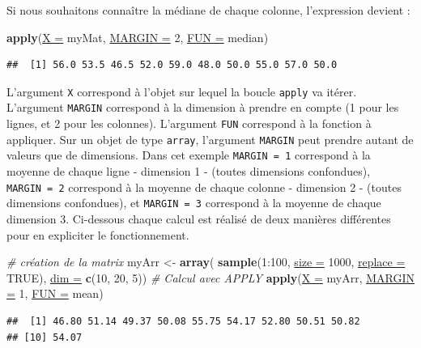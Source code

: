 \documentclass[twoside,symmetric]{book}
\newenvironment{Shaded}{}{}
\newcommand{\CommentTok}[1]{\textit{#1}}
\newcommand{\DataTypeTok}[1]{\underline{#1}}
\newcommand{\DecValTok}[1]{#1}
\newcommand{\KeywordTok}[1]{\textbf{#1}}
\newcommand{\NormalTok}[1]{#1}
\newcommand{\OperatorTok}[1]{#1}
\newcommand{\OtherTok}[1]{#1}
\newcommand{\StringTok}[1]{#1}
\begin{document}
Si nous souhaitons connaître la médiane de chaque colonne, l'expression devient :

\begin{Shaded}
\begin{Highlighting}[]
\KeywordTok{apply}\NormalTok{(}\DataTypeTok{X =}\NormalTok{ myMat, }\DataTypeTok{MARGIN =} \DecValTok{2}\NormalTok{, }\DataTypeTok{FUN =}\NormalTok{ median)}
\end{Highlighting}
\end{Shaded}

\begin{verbatim}
##  [1] 56.0 53.5 46.5 52.0 59.0 48.0 50.0 55.0 57.0 50.0
\end{verbatim}

L'argument \texttt{X} correspond à l'objet sur lequel la boucle \texttt{apply} va itérer. L'argument \texttt{MARGIN} correspond à la dimension à prendre en compte (1 pour les lignes, et 2 pour les colonnes). L'argument \texttt{FUN} correspond à la fonction à appliquer. Sur un objet de type \texttt{array}, l'argument \texttt{MARGIN} peut prendre autant de valeurs que de dimensions. Dans cet exemple \texttt{MARGIN\ =\ 1} correspond à la moyenne de chaque ligne - dimension 1 - (toutes dimensions confondues), \texttt{MARGIN\ =\ 2} correspond à la moyenne de chaque colonne - dimension 2 - (toutes dimensions confondues), et \texttt{MARGIN\ =\ 3} correspond à la moyenne de chaque dimension 3. Ci-dessous chaque calcul est réalisé de deux manières différentes pour en expliciter le fonctionnement.

\begin{Shaded}
\begin{Highlighting}[]
\CommentTok{# création de la matrix}
\NormalTok{myArr <-}\StringTok{ }\KeywordTok{array}\NormalTok{(}
  \KeywordTok{sample}\NormalTok{(}\DecValTok{1}\OperatorTok{:}\DecValTok{100}\NormalTok{, }\DataTypeTok{size =} \DecValTok{1000}\NormalTok{, }\DataTypeTok{replace =} \OtherTok{TRUE}\NormalTok{), }
  \DataTypeTok{dim =} \KeywordTok{c}\NormalTok{(}\DecValTok{10}\NormalTok{, }\DecValTok{20}\NormalTok{, }\DecValTok{5}\NormalTok{))}
\CommentTok{# Calcul avec APPLY}
\KeywordTok{apply}\NormalTok{(}\DataTypeTok{X =}\NormalTok{ myArr, }\DataTypeTok{MARGIN =} \DecValTok{1}\NormalTok{, }\DataTypeTok{FUN =}\NormalTok{ mean)}
\end{Highlighting}
\end{Shaded}

\begin{verbatim}
##  [1] 46.80 51.14 49.37 50.08 55.75 54.17 52.80 50.51 50.82
## [10] 54.07
\end{verbatim}
\end{document}
